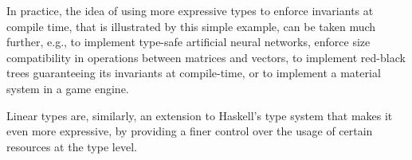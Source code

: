 \documentclass[]{lwnovathesis}
\begin{document}
In practice, the idea of using more expressive types to enforce invariants at
compile time, that is illustrated by this simple example, can be taken much
further, e.g., to implement type-safe artificial neural
networks\cite{https://blog.jle.im/entry/practical-dependent-types-in-haskell-1.html},
enforce size compatibility in operations between matrices and vectors\cite{}, to
implement red-black trees guaranteeing its invariants at compile-time, or to
implement a material system in a game engine\cite{}.

Linear types are, similarly, an extension to Haskell's type system that makes it
even more expressive, by providing a finer control over the usage of certain
resources at the type level.


\end{document}
